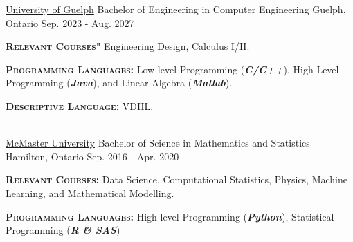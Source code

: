 


\begin{cventries}

\cventry
 {\href{https://www.uoguelph.ca/engineering/undergraduate/future-students/computer/}{University of Guelph}} %
    {Bachelor of Engineering in Computer Engineering} %
    {Guelph, Ontario} %
    {Sep. 2023 - Aug. 2027} %
       {
    \begin{cvitems} %
        \item{\textsc{\textbf{Relevant Courses"}} Engineering Design, Calculus I/II.}
        \item{\textsc{\textbf{Programming Languages:}} Low-level Programming (\textbf{\textit{C/C++}}), High-Level Programming (\textbf{\textit{Java}}), and Linear Algebra (\textbf{\textit{Matlab}}).}
        \item{\textsc{\textbf{Descriptive Language:}} VDHL.}
    \end{cvitems}
    }\\ \vspace{0.15cm}
\cventry
{\href{https://www.math.mcmaster.ca/undergraduate/undergrad-welcome.html}{McMaster University}} %
    {Bachelor of Science in Mathematics and Statistics} %
    {Hamilton, Ontario} %
    {Sep. 2016 - Apr. 2020} %
    {
    \begin{cvitems} %
        \item{\textsc{\textbf{Relevant Courses:}} Data Science, Computational Statistics, Physics, Machine Learning, and Mathematical Modelling.}
        \item{\textsc{\textbf{Programming Languages:}} High-level Programming (\textbf{\textit{Python}}), Statistical Programming (\textbf{\textit{R \& SAS}})}
    \end{cvitems}
    }
\end{cventries}
